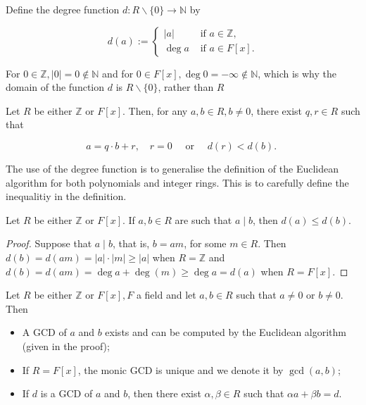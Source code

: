 \begin{definition}
  Define the degree function \(d: R \backslash\{0\} \rightarrow \mathbb{N}\) by

\[
d(a):= \begin{cases}|a| & \text { if } a \in \mathbb{Z}, \\ \operatorname{deg} a & \text { if } a \in F[x] .\end{cases}
\]

For \(0 \in \mathbb{Z},|0|=0 \notin \mathbb{N}\) and for \(0 \in F[x], \operatorname{deg} 0=-\infty \notin \mathbb{N}\), which is why the domain of the function \(d\) is \(R \backslash\{0\}\), rather than \(R\)
\end{definition}

\begin{proposition}
  Let \(R\) be either \(\mathbb{Z}\) or \(F[x]\). Then, for any \(a, b \in R, b \neq 0\), there exist \(q, r \in R\) such that

\[
\begin{equation*}
a=q \cdot b+r, \quad r=0 \quad \text { or } \quad d(r)<d(b) \text {. } \tag{*}
\end{equation*}
\]
\end{proposition}

\begin{remark}
  The use of the degree function is to generalise the definition of the Euclidean algorithm for both polynomials and integer rings. This is to carefully define the inequalitiy in the definition.
\end{remark}

\begin{lemma}
  Let \(R\) be either \(\mathbb{Z}\) or \(F[x]\). If \(a, b \in R\) are such that \(a \mid b\), then \(d(a) \leq d(b)\).
\end{lemma}

\begin{proof}
  Suppose that \(a \mid b\), that is, \(b=a m\), for some \(m \in R\). Then \(d(b)=d(a m)=|a| \cdot|m| \geq|a|\) when \(R=\mathbb{Z}\) and \(d(b)=d(a m)=\operatorname{deg} a+\operatorname{deg}(m) \geq \operatorname{deg} a=d(a)\) when \(R=F[x]\).
\end{proof}

\begin{theorem}
  
Let \(R\) be either \(\mathbb{Z}\) or \(F[x], F\) a field and let \(a, b \in R\) such that \(a \neq 0\) or \(b \neq 0\). Then
\begin{itemize}
\item[i)] A GCD of \(a\) and \(b\) exists and can be computed by the Euclidean algorithm (given in the proof);
\item[ii)] If \(R=F[x]\), the monic GCD is unique and we denote it by \(\operatorname{gcd}(a, b)\);
\item[iii)] If \(d\) is a GCD of \(a\) and \(b\), then there exist \(\alpha, \beta \in R\) such that \(\alpha a+\beta b=d\).
\end{itemize}

\end{theorem}

